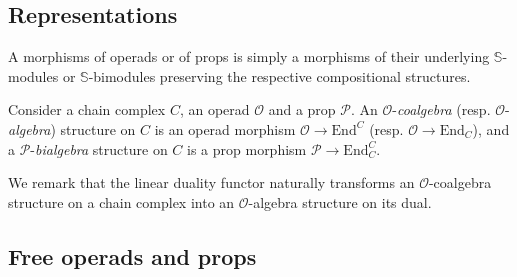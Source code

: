 \documentclass{amsart}
\renewcommand{\S}{\mathbb{S}}
\newcommand{\End}{\mathrm{End}}
\newtheorem{definition}[theorem]{Definition}
\begin{document}
%

\subsection{Representations}

A morphisms of operads or of props is simply a morphisms of their underlying $\S$-modules or $\S$-bimodules preserving the respective compositional structures.

Consider a chain complex $C$, an operad $\mathcal O$ and a prop $\mathcal P$. An $\mathcal O$-\textit{coalgebra} (resp. $\mathcal O$-\textit{algebra}) structure on $C$ is an operad morphism $\mathcal O \to \End^C$ (resp. $\mathcal O \to \End_C$), and a $\mathcal P$-\textit{bialgebra} structure on $C$ is a prop morphism $\mathcal P \to \End_C^C$.

We remark that the linear duality functor naturally transforms an $\mathcal O$-coalgebra structure on a chain complex into an $\mathcal O$-algebra structure on its dual.


\subsection{Free operads and props}
\end{document}
